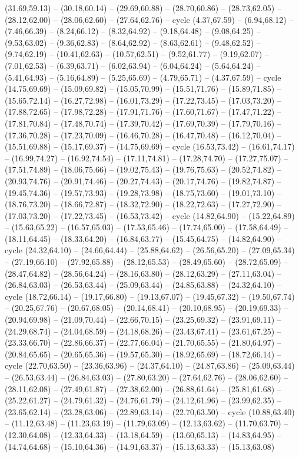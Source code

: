 {(31.69,59.13) -- (30.18,60.14) -- (29.69,60.88) -- (28.70,60.86) -- (28.73,62.05) -- (28.12,62.00) -- (28.06,62.60) -- (27.64,62.76) -- cycle (4.37,67.59) -- (6.94,68.12) -- (7.46,66.39) -- (8.24,66.12) -- (8.32,64.92) -- (9.18,64.48) -- (9.08,64.25) -- (9.53,63.02) -- (9.36,62.83) -- (8.64,62.92) -- (8.63,62.61) -- (9.48,62.52) -- (9.74,62.19) -- (10.41,62.63) -- (10.57,62.51) -- (9.52,61.77) -- (9.19,62.07) -- (7.01,62.53) -- (6.39,63.71) -- (6.02,63.94) -- (6.04,64.24) -- (5.64,64.24) -- (5.41,64.93) -- (5.16,64.89) -- (5.25,65.69) -- (4.79,65.71) -- (4.37,67.59) -- cycle (14.75,69.69) -- (15.09,69.82) -- (15.05,70.99) -- (15.51,71.76) -- (15.89,71.85) -- (15.65,72.14) -- (16.27,72.98) -- (16.01,73.29) -- (17.22,73.45) -- (17.03,73.20) -- (17.88,72.65) -- (17.98,72.28) -- (17.91,71.76) -- (17.60,71.67) -- (17.47,71.22) -- (17.81,70.84) -- (17.48,70.74) -- (17.39,70.42) -- (17.69,70.39) -- (17.79,70.16) -- (17.36,70.28) -- (17.23,70.09) -- (16.46,70.28) -- (16.47,70.48) -- (16.12,70.04) -- (15.51,69.88) -- (15.17,69.37) -- (14.75,69.69) -- cycle (16.53,73.42) -- (16.61,74.17) -- (16.99,74.27) -- (16.92,74.54) -- (17.11,74.81) -- (17.28,74.70) -- (17.27,75.07) -- (17.51,74.89) -- (18.06,75.66) -- (19.02,75.43) -- (19.76,75.63) -- (20.52,74.82) -- (20.93,74.76) -- (20.91,74.46) -- (20.27,74.43) -- (20.17,74.76) -- (19.82,74.87) -- (19.45,74.36) -- (19.57,73.93) -- (19.28,73.98) -- (18.75,73.60) -- (19.01,73.10) -- (18.76,73.20) -- (18.66,72.87) -- (18.32,72.90) -- (18.22,72.63) -- (17.27,72.90) -- (17.03,73.20) -- (17.22,73.45) -- (16.53,73.42) -- cycle (14.82,64.90) -- (15.22,64.89) -- (15.63,65.22) -- (16.57,65.03) -- (17.53,65.46) -- (17.74,65.00) -- (17.58,64.49) -- (18.11,64.45) -- (18.33,64.20) -- (16.84,63.77) -- (15.45,64.75) -- (14.82,64.90) -- cycle (24.32,64.10) -- (24.66,64.44) -- (25.88,64.62) -- (26.56,65.20) -- (27.09,65.34) -- (27.19,66.10) -- (27.92,65.88) -- (28.12,65.53) -- (28.49,65.60) -- (28.72,65.09) -- (28.47,64.82) -- (28.56,64.24) -- (28.16,63.80) -- (28.12,63.29) -- (27.11,63.04) -- (26.84,63.03) -- (26.53,63.44) -- (25.09,63.44) -- (24.85,63.88) -- (24.32,64.10) -- cycle (18.72,66.14) -- (19.17,66.80) -- (19.13,67.07) -- (19.45,67.32) -- (19.50,67.74) -- (20.25,67.76) -- (20.67,68.05) -- (20.14,68.41) -- (20.10,68.95) -- (20.19,69.33) -- (20.94,69.98) -- (21.09,70.44) -- (22.66,70.15) -- (23.25,69.32) -- (23.91,69.11) -- (24.29,68.74) -- (24.04,68.59) -- (24.18,68.26) -- (23.43,67.41) -- (23.61,67.25) -- (23.33,66.70) -- (22.86,66.37) -- (22.77,66.04) -- (21.70,65.55) -- (21.80,64.97) -- (20.84,65.65) -- (20.65,65.36) -- (19.57,65.30) -- (18.92,65.69) -- (18.72,66.14) -- cycle (22.70,63.50) -- (23.36,63.96) -- (24.37,64.10) -- (24.87,63.86) -- (25.09,63.44) -- (26.53,63.44) -- (26.84,63.03) -- (27.80,63.20) -- (27.64,62.76) -- (28.06,62.60) -- (28.11,62.08) -- (27.49,61.87) -- (27.38,62.00) -- (26.88,61.64) -- (25.81,61.68) -- (25.22,61.27) -- (24.79,61.32) -- (24.76,61.79) -- (24.12,61.96) -- (23.99,62.35) -- (23.65,62.14) -- (23.28,63.06) -- (22.89,63.14) -- (22.70,63.50) -- cycle (10.88,63.40) -- (11.12,63.48) -- (11.23,63.19) -- (11.79,63.09) -- (12.13,63.62) -- (11.70,63.70) -- (12.30,64.08) -- (12.33,64.33) -- (13.18,64.59) -- (13.60,65.13) -- (14.83,64.95) -- (14.74,64.68) -- (15.10,64.36) -- (14.91,63.37) -- (15.13,63.33) -- (15.13,63.08) }
